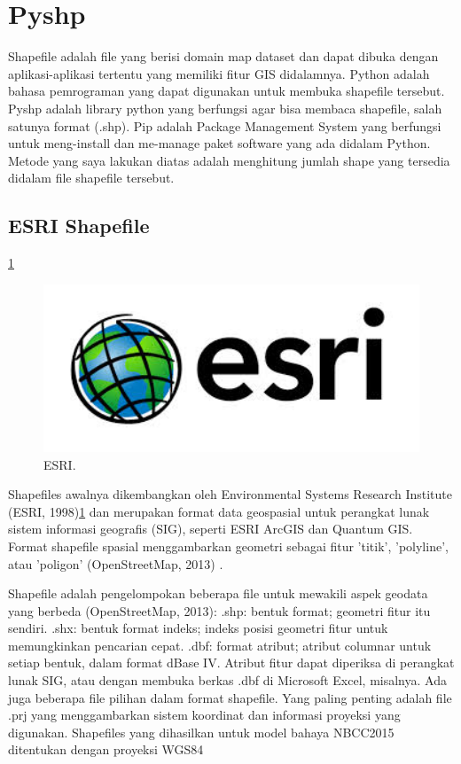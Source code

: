 
\section{Pyshp}
Shapefile adalah file yang berisi domain map dataset dan dapat dibuka dengan aplikasi-aplikasi tertentu yang memiliki fitur GIS didalamnya.
Python adalah bahasa pemrograman yang dapat digunakan untuk membuka shapefile tersebut.
Pyshp adalah library python yang berfungsi agar bisa membaca shapefile, salah satunya format (.shp).
Pip adalah Package Management System yang berfungsi untuk meng-install dan me-manage paket software yang ada didalam Python.
Metode yang saya lakukan diatas adalah menghitung jumlah shape yang tersedia didalam file shapefile tersebut.

\subsection{ESRI Shapefile}
\ref{esri}
	\begin{figure}[ht]
	\centerline{\includegraphics[width=1\textwidth]{figures/esri.JPG}}
	\caption{ESRI.}
	\label{esri}
	\end{figure}

Shapefiles awalnya dikembangkan oleh Environmental Systems Research Institute (ESRI, 1998)\ref{esri} dan merupakan format data geospasial untuk perangkat lunak sistem informasi geografis (SIG), seperti ESRI ArcGIS dan Quantum GIS.
Format shapefile spasial menggambarkan geometri sebagai fitur 'titik', 'polyline', atau 'poligon' (OpenStreetMap, 2013) \cite{halchuk2014fifth}.

Shapefile adalah pengelompokan beberapa file untuk mewakili aspek geodata yang berbeda (OpenStreetMap, 2013):
.shp: bentuk format; geometri fitur itu sendiri.
.shx: bentuk format indeks; indeks posisi geometri fitur untuk memungkinkan pencarian cepat.
.dbf: format atribut; atribut columnar untuk setiap bentuk, dalam format dBase IV.
Atribut fitur dapat diperiksa di perangkat lunak SIG, atau dengan membuka berkas .dbf di Microsoft Excel, misalnya. Ada juga beberapa file pilihan dalam format shapefile. Yang paling penting adalah file .prj yang menggambarkan sistem koordinat dan informasi proyeksi yang digunakan. Shapefiles yang dihasilkan untuk model bahaya NBCC2015 ditentukan dengan proyeksi WGS84

